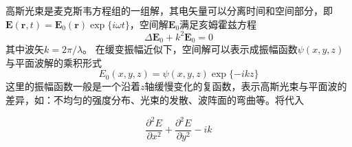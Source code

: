 
\begin{issues}
\issueDraft
\end{issues}


高斯光束是麦克斯韦方程组的一组解，其电矢量可以分离时间和空间部分，即$\boldsymbol E(\boldsymbol r,t)=\boldsymbol E_0(\boldsymbol r)\exp\{i\omega t\}$，空间解$\boldsymbol  E_0$满足亥姆霍兹方程
\begin{equation}
\Delta \boldsymbol E_0 + k^2 \boldsymbol E_0=0
\end{equation}
其中波矢$k=2\pi/\lambda$。
在缓变振幅近似下，空间解可以表示成振幅函数$\psi(x,y,z)$与平面波解的乘积形式
\begin{equation}\label{FMGB_eq2}
E_0(x,y,z) = \psi(x,y,z)\exp\{-ikz\}
\end{equation}
这里的振幅函数一般是一个沿着$z$轴缓慢变化的复函数，表示高斯光束与平面波的差异，如：不均匀的强度分布、光束的发散、波阵面的弯曲等。将代入
 


\begin{equation}\label{FMGB_eq1}
\frac{\partial^2 E}{\partial x^2} +\frac{\partial^2 E}{\partial y^2} -ik 
\end{equation}

